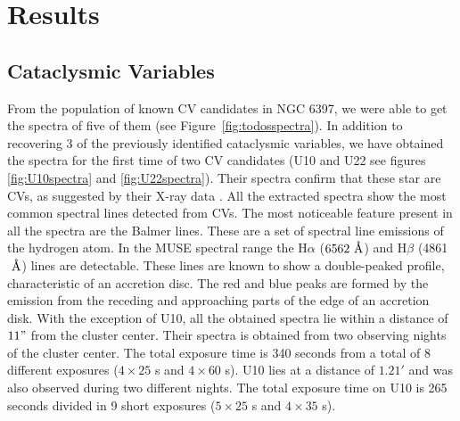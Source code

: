 \chapter{Results}\label{chap:results}
\thispagestyle{fancy}

\section{Cataclysmic Variables }
From the population of known CV candidates in NGC 6397, we were able to get the spectra of five of them (see Figure~\ref{fig:todosspectra}). In addition to recovering 3 of the previously identified cataclysmic variables, we have obtained the spectra for the first time of two CV candidates (U10 and U22 see figures \ref{fig:U10spectra} and \ref{fig:U22spectra}).  Their spectra confirm that these star are CVs, as suggested by their X-ray data \citep{grindlay_chandra_2001}. All the extracted spectra show the most common spectral lines detected from CVs. The most noticeable feature present in all the spectra are the Balmer lines. These are a set of spectral line emissions of the hydrogen atom. In the MUSE spectral range the H$\alpha$ ($6562 \text{ \r A}$) and H$\beta$ (4861 $\text{ \r A}$) lines are detectable. These lines are known to show a double-peaked profile, characteristic of an accretion disc. The red and blue peaks are formed by the emission from the receding and approaching parts of the edge of an accretion disk. With the exception of U10, all the obtained spectra lie within a distance of $11"$ from the cluster center. Their spectra is obtained from two observing nights of the cluster center. The total exposure time is 340 seconds from a total of 8 different exposures ($4 \times 25$ s and $4 \times 60$ s). U10 lies at a distance of $1.21'$ and was also observed during two different nights. The total exposure time on U10 is 265 seconds divided in 9 short exposures ($5 \times 25$ s and $4 \times 35$ s).

